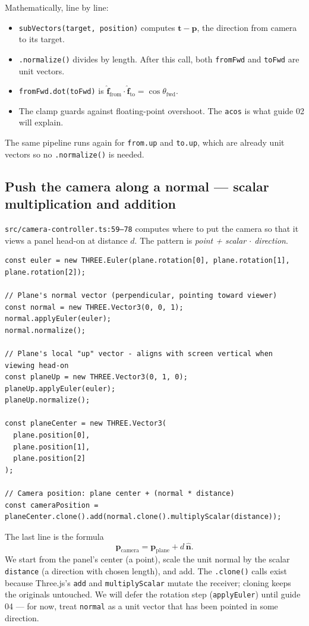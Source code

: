 \documentclass{article}
\begin{document}
Mathematically, line by line:
\begin{itemize}
  \item \texttt{subVectors(target, position)} computes $\mathbf{t} - \mathbf{p}$, the direction from camera to its target.
  \item \texttt{.normalize()} divides by length. After this call, both \texttt{fromFwd} and \texttt{toFwd} are unit vectors.
  \item \texttt{fromFwd.dot(toFwd)} is $\hat{\mathbf{f}}_{\text{from}} \cdot \hat{\mathbf{f}}_{\text{to}} = \cos\theta_{\text{fwd}}$.
  \item The clamp guards against floating-point overshoot. The \texttt{acos} is what guide 02 will explain.
\end{itemize}
The same pipeline runs again for \texttt{from.up} and \texttt{to.up}, which
are already unit vectors so no \texttt{.normalize()} is needed.

\subsection{Push the camera along a normal --- scalar multiplication and addition}

\texttt{src/camera-controller.ts:59--78} computes where to put the camera so
that it views a panel head-on at distance $d$. The pattern is
\emph{point + scalar $\cdot$ direction}.

\begin{lstlisting}
const euler = new THREE.Euler(plane.rotation[0], plane.rotation[1], plane.rotation[2]);

// Plane's normal vector (perpendicular, pointing toward viewer)
const normal = new THREE.Vector3(0, 0, 1);
normal.applyEuler(euler);
normal.normalize();

// Plane's local "up" vector - aligns with screen vertical when viewing head-on
const planeUp = new THREE.Vector3(0, 1, 0);
planeUp.applyEuler(euler);
planeUp.normalize();

const planeCenter = new THREE.Vector3(
  plane.position[0],
  plane.position[1],
  plane.position[2]
);

// Camera position: plane center + (normal * distance)
const cameraPosition = planeCenter.clone().add(normal.clone().multiplyScalar(distance));
\end{lstlisting}

The last line is the formula
\[
\mathbf{p}_{\text{camera}} = \mathbf{p}_{\text{plane}} + d \, \hat{\mathbf{n}}.
\]
We start from the panel's center (a point), scale the unit normal by the
scalar \texttt{distance} (a direction with chosen length), and add. The
\texttt{.clone()} calls exist because Three.js's \texttt{add} and
\texttt{multiplyScalar} mutate the receiver; cloning keeps the originals
untouched. We will defer the rotation step (\texttt{applyEuler}) until guide
04 --- for now, treat \texttt{normal} as a unit vector that has been pointed
in some direction.
\end{document}
